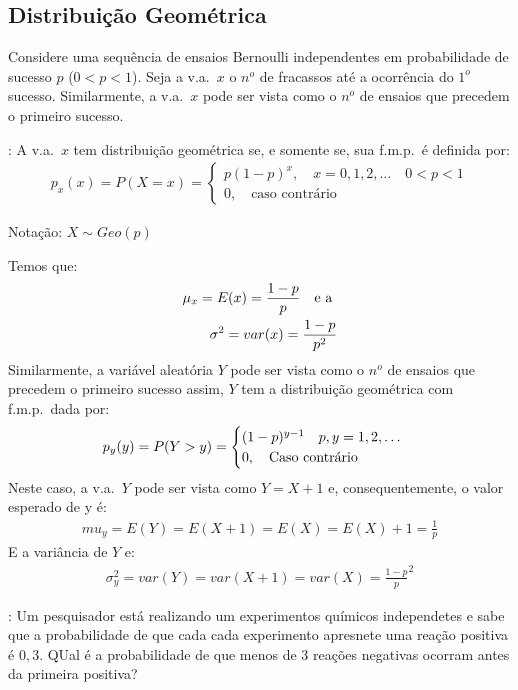       \subsection{Distribuição Geométrica}
      \begin{description}
        \item  Considere uma sequência de ensaios Bernoulli independentes em probabilidade de 
      sucesso $p$ ($0<p<1$). Seja a v.a.\ $x$ o $n^o$ de fracassos até a ocorrência 
      do $1^o$ sucesso. Similarmente, a v.a.\ $x$ pode ser vista como o $n^o$ de ensaios que precedem 
      o primeiro sucesso.

    \item[Definição]: A v.a.\ $x$ tem distribuição geométrica se, e somente se, sua 
      f.m.p.\ é definida por: 
      \begin{align}
        p_{x}(x)=P(X=x)=\begin{cases}
          p(1-p)^x, \quad x=0,1,2,\dots \quad 0<p<1\\
          0, \quad \text{caso contrário}
        \end{cases}
      \end{align}
      \begin{center}Notação: $X \sim Geo(p)$\end{center}
      Temos que:
      \begin{align}
        \mu_{x}=E(x)=\frac{1-p}{p} \text{\quad e a }\\
        \sigma^2 = var(x)=\frac{1-p}{p^2}
      \end{align}
      Similarmente, a variável aleatória $Y$ pode ser vista como o $n^o$ de ensaios que
      precedem o primeiro sucesso assim, $Y$ tem a distribuição geométrica com f.m.p.\ dada por:
        \begin{align}
        p_y(y)=P(Y>y)=\begin{cases}
          (1-p)^{y-1} \text{\quad }p,y=1,2,\dots \\
          0, \text{\quad Caso contrário}
        \end{cases}
      \end{align}
      Neste caso, a v.a.\ $Y$ pode ser vista como $Y=X+1$ e, consequentemente, o valor esperado de y é:
      \begin{align} 
      mu_y=E(Y)=E(X+1)=E(X)=E(X)+1= \frac{1}{p}
    \end{align}
    E a variância de $Y$ e:
    \begin{align}
      \sigma_y^2=var(Y)=var(X+1)=var(X)= \frac{1-p}{p}^2
    \end{align}
  \item[Exemplo]: Um pesquisador está realizando um experimentos químicos independetes 
      e sabe que a probabilidade de que cada cada experimento apresnete uma reação 
      positiva é $0,3$. QUal é a probabilidade de que menos de 3 reações negativas 
      ocorram antes da primeira positiva?


\end{description}
